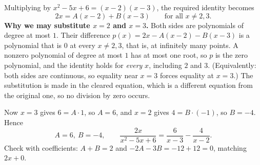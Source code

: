 Multiplying by $x^2-5x+6=(x-2)(x-3)$, the required identity becomes
\[2x=A(x-2)+B(x-3)\qquad\text{for all }x\ne2,3 .\]
\textbf{Why we may substitute $x=2$ and $x=3$.} Both sides are polynomials of degree at most $1$. Their difference $p(x)=2x-A(x-2)-B(x-3)$ is a polynomial that is $0$ at every $x\ne2,3$, that is, at infinitely many points. A nonzero polynomial of degree at most $1$ has at most one root, so $p$ is the zero polynomial, and the identity holds for \emph{every} $x$, including $2$ and $3$. (Equivalently: both sides are continuous, so equality near $x=3$ forces equality at $x=3$.) The substitution is made in the cleared equation, which is a different equation from the original one, so no division by zero occurs.

Now $x=3$ gives $6=A\cdot1$, so $A=6$, and $x=2$ gives $4=B\cdot(-1)$, so $B=-4$. Hence
\[\boxed{A=6,\ B=-4},\qquad \dfrac{2x}{x^2-5x+6}=\dfrac{6}{x-3}-\dfrac{4}{x-2}.\]
Check with coefficients: $A+B=2$ and $-2A-3B=-12+12=0$, matching $2x+0$.
